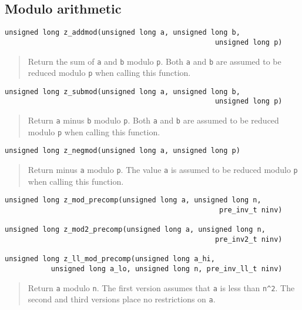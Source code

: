 \documentclass[a4paper,10pt]{article}
\newcommand{\code}{\lstinline}
\begin{document}
\subsection{Modulo arithmetic}

\begin{lstlisting}
unsigned long z_addmod(unsigned long a, unsigned long b, 
                                                  unsigned long p)
\end{lstlisting}
\begin{quote}
Return the sum of \code{a} and \code{b} modulo \code{p}. Both \code{a} and \code{b} are assumed to be reduced modulo \code{p} when calling this function. 
\end{quote}

\begin{lstlisting}
unsigned long z_submod(unsigned long a, unsigned long b, 
                                                  unsigned long p)
\end{lstlisting}
\begin{quote}
Return \code{a} minus \code{b} modulo \code{p}. Both \code{a} and \code{b} are assumed to be reduced modulo \code{p} when calling this function. 
\end{quote}

\begin{lstlisting}
unsigned long z_negmod(unsigned long a, unsigned long p)
\end{lstlisting}
\begin{quote}
Return minus \code{a} modulo \code{p}. The value \code{a} is assumed to be reduced modulo \code{p} when calling this function. 
\end{quote}

\begin{lstlisting}
unsigned long z_mod_precomp(unsigned long a, unsigned long n, 
                                                   pre_inv_t ninv)

unsigned long z_mod2_precomp(unsigned long a, unsigned long n, 
                                                  pre_inv2_t ninv)

unsigned long z_ll_mod_precomp(unsigned long a_hi,
           unsigned long a_lo, unsigned long n, pre_inv_ll_t ninv)
\end{lstlisting}
\begin{quote}
Return \code{a} modulo \code{n}. The first version assumes that \code{a} is less than \code{n^2}. The second and third versions place no restrictions on \code{a}.
\end{quote}
\end{document}
